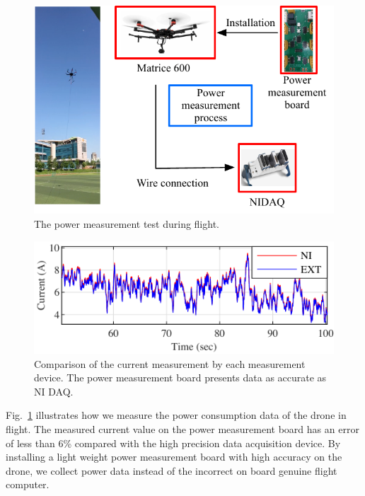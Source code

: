 \documentclass[journal]{./template/IEEEtran}
\begin{document}
\begin{figure}[ht]
\centering
\includegraphics[scale=0.8]{fig3/flight_experiment.pdf}
\caption{The power measurement test during flight.}
\label{fig:flight_test}
\end{figure}

\begin{figure}[ht]
\centering
\includegraphics[scale=1.0]{fig4/flight_exp_result.pdf}
\caption{Comparison of the current measurement by each measurement device. The power measurement board presents data as accurate as NI DAQ.}
\end{figure}
\label{Section: Design the power measurement board}

Fig.~\ref{fig:flight_test} illustrates how we measure the power consumption data of the drone in flight.
The measured current value on the power measurement board has an error of less than 6\% compared with the high precision data acquisition device. By installing a light weight power measurement board with high accuracy on the drone, we collect power data instead of the incorrect on board genuine flight computer.
\end{document}
